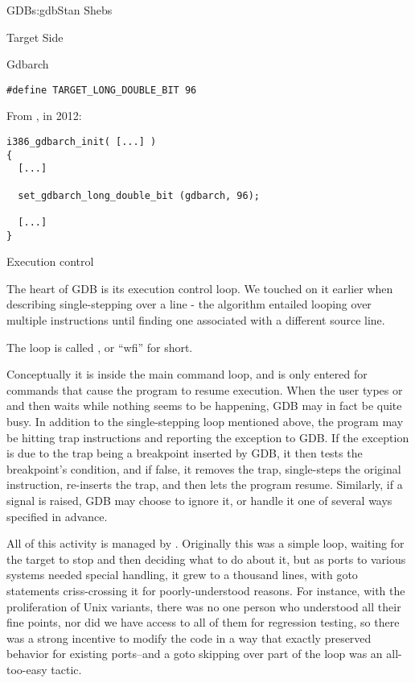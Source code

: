 \begin{aosachapter}{GDB}{s:gdb}{Stan Shebs}
\begin{aosasect1}{Target Side}
\begin{aosasect2}{Gdbarch}
\begin{verbatim}
#define TARGET_LONG_DOUBLE_BIT 96
\end{verbatim}

From , in 2012:

\begin{verbatim}
i386_gdbarch_init( [...] )
{
  [...]

  set_gdbarch_long_double_bit (gdbarch, 96);

  [...]
}
\end{verbatim}

\end{aosasect2}

\begin{aosasect2}{Execution control}

The heart of GDB is its execution control loop.  We touched on it
earlier when describing single-stepping over a line - the algorithm
entailed looping over multiple instructions until finding one
associated with a different source line.

The loop is called , or ``wfi'' for short.

Conceptually it is inside the main command loop, and is only entered
for commands that cause the program to resume execution.  When the
user types  or  and then waits while nothing
seems to be happening, GDB may in fact be quite busy.  In addition to
the single-stepping loop mentioned above, the program may be hitting
trap instructions and reporting the exception to GDB.  If the
exception is due to the trap being a breakpoint inserted by GDB, it
then tests the breakpoint's condition, and if false, it removes the
trap, single-steps the original instruction, re-inserts the trap, and
then lets the program resume.  Similarly, if a signal is raised, GDB
may choose to ignore it, or handle it one of several ways specified in
advance.

All of this activity is managed by .
Originally this was a simple loop, waiting for the target to stop and
then deciding what to do about it, but as ports to various systems
needed special handling, it grew to a thousand lines, with goto
statements criss-crossing it for poorly-understood reasons.  For
instance, with the proliferation of Unix variants, there was no one
person who understood all their fine points, nor did we have access to
all of them for regression testing, so there was a strong incentive to
modify the code in a way that exactly preserved behavior for existing
ports--and a goto skipping over part of the loop was an all-too-easy
tactic.


\end{aosasect2}
\end{aosasect1}
\end{aosachapter}
